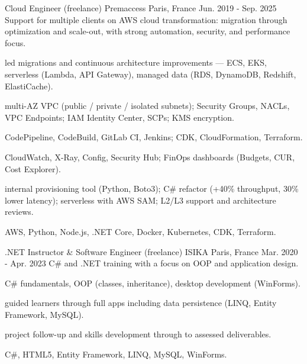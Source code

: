\begin{cventries}
  \cventrywithintro
    {Cloud Engineer (freelance)} %
    {Premaccess} %
    {Paris, France} %
    {Jun. 2019 - Sep. 2025} %
    {Support for multiple clients on AWS cloud transformation: migration through optimization and scale-out, with strong automation, security, and performance focus.} %
    {
      \begin{cvitemsafterintro}
        \item { led migrations and continuous architecture improvements --- ECS, EKS, serverless (Lambda, API Gateway), managed data (RDS, DynamoDB, Redshift, ElastiCache).}
        \item { multi-AZ VPC (public / private / isolated subnets); Security Groups, NACLs, VPC Endpoints; IAM Identity Center, SCPs; KMS encryption.}
        \item { CodePipeline, CodeBuild, GitLab CI, Jenkins; CDK, CloudFormation, Terraform.}
        \item { CloudWatch, X-Ray, Config, Security Hub; FinOps dashboards (Budgets, CUR, Cost Explorer).}
        \item { internal provisioning tool (Python, Boto3); C\# refactor (+40\% throughput, 30\% lower latency); serverless with AWS SAM; L2/L3 support and architecture reviews.}
      \end{cvitemsafterintro}
    }
    {AWS, Python, Node.js, .NET Core, Docker, Kubernetes, CDK, Terraform.}

  \cventrywithintro
    {.NET Instructor \& Software Engineer (freelance)} %
    {ISIKA} %
    {Paris, France} %
    {Mar. 2020 - Apr. 2023} %
    {C\# and .NET training with a focus on OOP and application design.} %
    {
      \begin{cvitemsafterintro}
        \item { C\# fundamentals, OOP (classes, inheritance), desktop development (WinForms).}
        \item { guided learners through full apps including data persistence (LINQ, Entity Framework, MySQL).}
        \item { project follow-up and skills development through to assessed deliverables.}
      \end{cvitemsafterintro}
    }
    {C\#, HTML5, Entity Framework, LINQ, MySQL, WinForms.}


\end{cventries}

